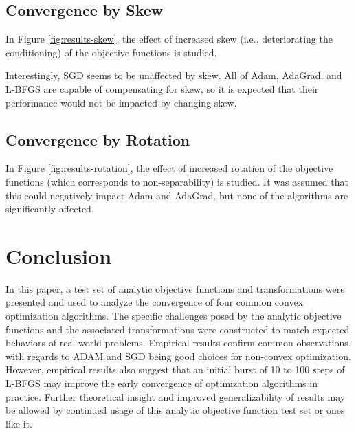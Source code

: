 \documentclass[conference]{ieeeconf}  %
\begin{document}
\subsection{Convergence by Skew}

In Figure \ref{fig:results-skew}, the effect of increased skew (i.e.,
deteriorating the conditioning) of the objective functions is studied.

Interestingly, SGD seems to be unaffected by skew. All of Adam,
AdaGrad, and L-BFGS are capable of compensating for skew, so it is
expected that their performance would not be impacted by changing
skew.

\subsection{Convergence by Rotation}

In Figure \ref{fig:results-rotation}, the effect of increased rotation
of the objective functions (which corresponds to non-separability) is
studied.  It was assumed that this could negatively impact Adam and
AdaGrad, but none of the algorithms are significantly affected.

\section{Conclusion}

In this paper, a test set of analytic objective functions and
transformations were presented and used to analyze the convergence of
four common convex optimization algorithms. The specific challenges
posed by the analytic objective functions and the associated
transformations were constructed to match expected behaviors of
real-world problems.  Empirical results confirm common observations
with regards to ADAM and SGD being good choices for non-convex
optimization. However, empirical results also suggest that an initial
burst of 10 to 100 steps of L-BFGS may improve the early convergence
of optimization algorithms in practice. Further theoretical insight
and improved generalizability of results may be allowed by continued
usage of this analytic objective function test set or ones like it.

\balance



\end{document}
